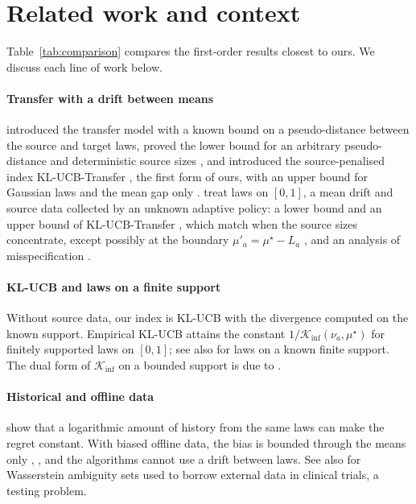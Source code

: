 \documentclass[11pt]{article}
\newcommand{\Kinf}{\mathcal{K}_{\inf}}
\begin{document}
\section{Related work and context}\label{sec:related}\label{sec:closest}

Table~\ref{tab:comparison} compares the first-order results closest to ours. We discuss each line
of work below.

\paragraph{Transfer with a drift between means} \citet{PMM25} introduced the transfer model with a
known bound on a pseudo-distance between the source and target laws, proved the lower bound for an
arbitrary pseudo-distance and deterministic source sizes \citep[Theorem~3]{PMM25}, and introduced
the source-penalised index KL-UCB-Transfer \citep[Section~5.2, (4)]{PMM25}, the first form of ours,
with an upper bound for Gaussian laws and the mean gap only \citep[Theorem~6]{PMM25}.
\citet{PMRM26} treat laws on $[0,1]$, a mean drift and source data collected by an unknown adaptive
policy: a lower bound \citep[Theorem~2]{PMRM26} and an upper bound of KL-UCB-Transfer
\citep[Theorem~3]{PMRM26}, which match when the source sizes concentrate, except possibly at
the boundary $\mu'_a=\mu^\star-L_a$ \citep[Proposition~4]{PMRM26}, and an analysis of misspecification \citep[Theorem~5]{PMRM26}.

\paragraph{KL-UCB and laws on a finite support} Without source data, our index is KL-UCB with the
divergence computed on the known support. Empirical KL-UCB \citep[Theorem~2]{CGMMS13} attains the
constant $1/\Kinf(\nu_a,\mu^\star)$ for finitely supported laws on $[0,1]$; see also
\citet{BK96} for laws on a known finite support. The dual form of $\Kinf$ on a bounded support is
due to \citet[Theorems~5 and~8]{HT10}.

\paragraph{Historical and offline data} \citet{SJ12} show that a logarithmic amount of history from
the same laws can make the regret constant. With biased offline data, the bias is bounded through
the means only \citep[(4)]{CL24}, \citep{LFCK26}, and the algorithms cannot use a drift between
laws. See also \citet{KT26} for Wasserstein ambiguity sets used to borrow external data in clinical
trials, a testing problem.
\end{document}
